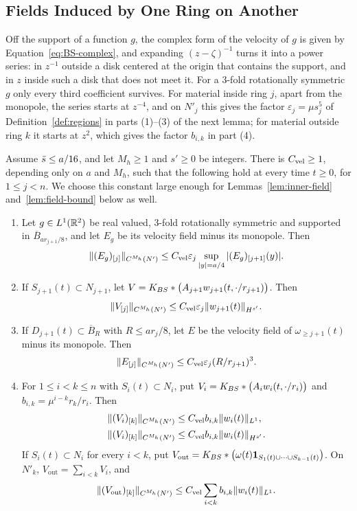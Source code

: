 \subsection{Fields Induced by One Ring on Another}

Off the support of a function $g$, the complex form of the velocity of $g$ is
given by Equation~\eqref{eq:BS-complex}, and expanding $(z-\zeta)^{-1}$ turns it
into a power series: in $z^{-1}$ outside a disk centered at the origin that
contains the support, and in $z$ inside such a disk that does not meet it. For a $3$-fold rotationally
symmetric $g$ only every third coefficient survives. For material inside
ring $j$, apart from the monopole, the series starts at
$z^{-4}$, and on $N'_j$ this gives the factor $\varepsilon_j=\mu s_j^5$ of
Definition~\ref{def:regions} in parts (1)--(3) of the next lemma; for material
outside ring $k$ it starts at $z^2$, which gives the factor $b_{i,k}$ in
part (4).

\begin{lemma}
\label{lem:transfer}
Assume $\bar s\le a/16$, and let $M_h\ge1$ and $s'\ge0$ be integers. There is
$C_{\mathrm{vel}}\ge1$, depending only on $a$ and $M_h$, such that the following hold at
every time $t\ge0$, for $1\le j<n$. We choose this constant large enough for
Lemmas~\ref{lem:inner-field} and~\ref{lem:field-bound} below as well.
\begin{enumerate}[label=\textup{(\arabic*)}]
\item Let $g\in L^1(\mathbb{R}^2)$ be real valued, $3$-fold rotationally symmetric and supported in
  $\overline B_{ar_{j+1}/8}$, and let $E_g$ be its velocity field minus its
  monopole. Then
  \[
  \|(E_g)_{[j]}\|_{C^{M_h}(N')}
  \le C_{\mathrm{vel}}\varepsilon_j\sup_{|y|=a/4}|(E_g)_{[j+1]}(y)|.
  \]
\item If $S_{j+1}(t)\subset N_{j+1}$, let
  $V=K_{BS}\ast\big(A_{j+1}w_{j+1}(t,\cdot/r_{j+1})\big)$. Then
  \[
  \|V_{[j]}\|_{C^{M_h}(N')}
  \le C_{\mathrm{vel}}\varepsilon_j\|w_{j+1}(t)\|_{H^{s'}}.
  \]
\item If $D_{j+1}(t)\subset\overline B_R$ with $R\le ar_j/8$, let $E$ be the
  velocity field of $\omega_{\ge j+1}(t)$ minus its monopole. Then
  \[
  \|E_{[j]}\|_{C^{M_h}(N')}
  \le C_{\mathrm{vel}}\varepsilon_j(R/r_{j+1})^3.
  \]
\item For $1\le i<k\le n$ with $S_i(t)\subset N_i$, put
  $V_i=K_{BS}\ast\big(A_iw_i(t,\cdot/r_i)\big)$ and
  $b_{i,k}=\mu^{i-k}r_k/r_i$. Then
  \[
  \begin{aligned}
  \|(V_i)_{[k]}\|_{C^{M_h}(N')}&\le C_{\mathrm{vel}} b_{i,k}\|w_i(t)\|_{L^1},\\
  \|(V_i)_{[k]}\|_{C^{M_h}(N')}&\le C_{\mathrm{vel}} b_{i,k}\|w_i(t)\|_{H^{s'}}.
  \end{aligned}
  \]
  If $S_i(t)\subset N_i$ for every $i<k$, put
  $V_{\mathrm{out}}=K_{BS}\ast\big(\omega(t)\mathbf 1_{S_1(t)\cup\dots\cup S_{k-1}(t)}\big)$.
  On $N'_k$, $V_{\mathrm{out}}=\sum_{i<k}V_i$, and
  \[
  \|(V_{\mathrm{out}})_{[k]}\|_{C^{M_h}(N')}
  \le C_{\mathrm{vel}}\sum_{i<k}b_{i,k}\|w_i(t)\|_{L^1}.
  \]
\end{enumerate}
\end{lemma}

